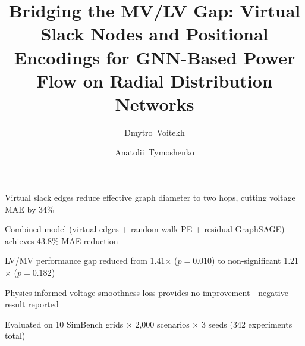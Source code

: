 \documentclass[preprint,review,12pt]{elsarticle}
\begin{document}
\begin{frontmatter}

\title{Bridging the MV/LV Gap: Virtual Slack Nodes and Positional Encodings for GNN-Based Power Flow on Radial Distribution Networks}

\author[ua]{Dmytro~Voitekh}

\author[ua]{Anatolii~Tymoshenko}


\begin{highlights}
\item Virtual slack edges reduce effective graph diameter to two hops, cutting voltage MAE by 34\%
\item Combined model (virtual edges + random walk PE + residual GraphSAGE) achieves 43.8\% MAE reduction
\item LV/MV performance gap reduced from 1.41$\times$ ($p=0.010$) to non-significant 1.21$\times$ ($p=0.182$)
\item Physics-informed voltage smoothness loss provides no improvement---negative result reported
\item Evaluated on 10 SimBench grids $\times$ 2,000 scenarios $\times$ 3 seeds (342 experiments total)
\end{highlights}


\end{frontmatter}
\end{document}
